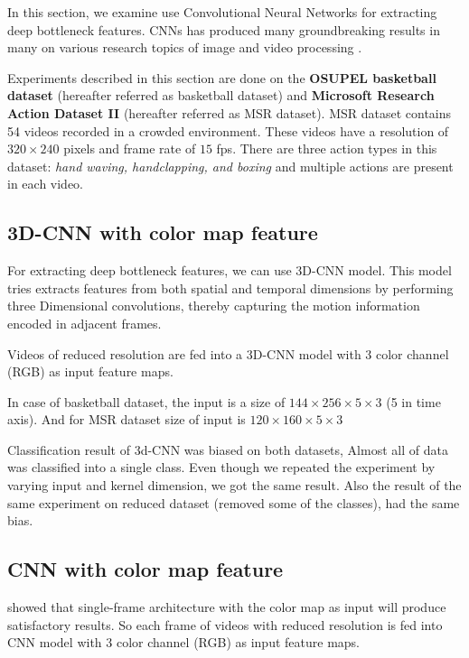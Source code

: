In this section, we examine use Convolutional Neural Networks for extracting deep bottleneck features. CNNs has produced many groundbreaking results in many on various research topics of image and video processing \citep{KarpathyCVPR14, ji20133d, krizhevsky2012imagenet}. 

Experiments described in this section are done on the \textbf{OSUPEL basketball dataset} \cite{brendel2011probabilistic} (hereafter referred as basketball dataset) and \textbf{Microsoft Research Action Dataset \RN{2}} (hereafter referred as MSR dataset). MSR dataset contains 54 videos recorded in a crowded environment. These videos have a resolution of $320 \times 240$ pixels and frame rate of $15$ fps. There are three action types in this dataset: \textit{hand waving, handclapping, and boxing } and multiple actions are present in each video.

\subsection{3D-CNN with color map feature}
For extracting deep bottleneck features, we can use 3D-CNN model. This model tries extracts features from both spatial and temporal dimensions by performing three Dimensional convolutions, thereby capturing the motion information encoded in adjacent frames\citep{ji20133d}.

Videos of reduced resolution are fed into a 3D-CNN model with 3 color channel (RGB) as input feature maps. 

In case of basketball dataset, the input is a size of $144 \times 256 \times 5 \times 3$ (5 in time axis). And for MSR dataset size of input is $120 \times 160 \times 5 \times 3$

Classification result of 3d-CNN was biased on both datasets, Almost all of data was classified into a single class. Even though we repeated the experiment by varying input and kernel dimension, we got the same result. Also the result of the same experiment on reduced dataset (removed some of the classes), had the same bias. 

\subsection{CNN with color map feature}
\citet{KarpathyCVPR14} showed that single-frame architecture with the color map as input will produce satisfactory results. So each frame of videos with reduced resolution is fed into CNN model with 3 color channel (RGB) as input feature maps.

